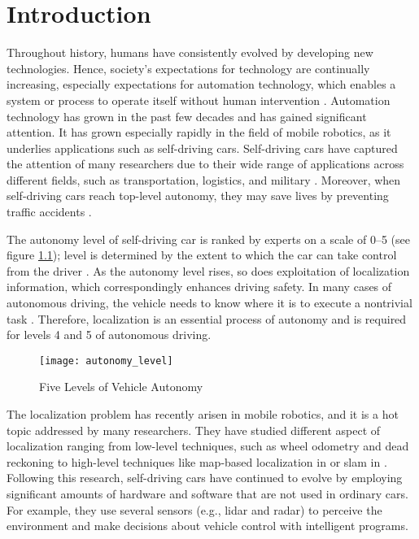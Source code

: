 \chapter{Introduction}
Throughout history, humans have consistently evolved by developing new technologies. Hence, society’s expectations for technology are continually increasing, especially expectations for automation technology, which enables a system or process to operate itself without human intervention \cite{intro_auto}. Automation technology has grown in the past few decades and has gained significant attention. It has grown especially rapidly in the field of mobile
robotics, as it underlies applications such as self-driving cars. Self-driving cars have
captured the attention of many researchers due to their wide range of applications across different fields, such as transportation, logistics, and military \cite{ACs}. Moreover, when self-driving cars reach top-level autonomy, they may save lives by preventing traffic accidents \cite{ACs1}.
\par The autonomy level of self-driving car is ranked by experts on a scale of 0–5 (see figure \ref{fig:autolevel}); level is determined by the extent to which the car can take control from the driver \cite{SAE}. As the autonomy level rises, so does exploitation of localization information, which correspondingly enhances driving safety. In many cases of autonomous driving, the vehicle needs to know where it is to execute a nontrivial task \cite{ACs2}. Therefore, localization is an essential process of autonomy and is required for levels 4 and 5 of autonomous driving.
\begin{figure}[H]
    \centering
    \texttt{[image: autonomy\_level]}
    \caption{Five Levels of Vehicle Autonomy}
    \label{fig:autolevel}
\end{figure}

\par The localization problem has recently arisen in mobile robotics, and it is a hot topic addressed by many researchers. They have studied different aspect of localization ranging from low-level techniques, such as wheel odometry and dead reckoning \cite{ACs3,ACs4} to high-level techniques like map-based localization in \cite{ACs2} or \acrfull{slam} in \cite{6D_SLAM,NDT_SLAM}. Following this research, self-driving cars have continued to evolve by employing significant amounts of hardware and software that are not used in ordinary cars. For example, they use several sensors (e.g., \acrfull{lidar} and \acrfull{radar}) to perceive the environment and make decisions about vehicle control with intelligent programs.

